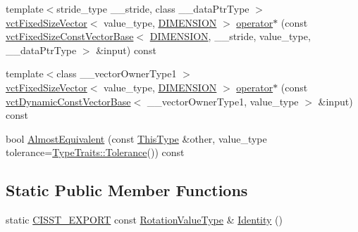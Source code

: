 \begin{DoxyCompactItemize}
\item 
{\footnotesize template$<$stride\+\_\+type \+\_\+\+\_\+stride, class \+\_\+\+\_\+data\+Ptr\+Type $>$ }\\\hyperlink{classvct_fixed_size_vector}{vct\+Fixed\+Size\+Vector}$<$ value\+\_\+type, \hyperlink{classvct_matrix_rotation3_const_base_a6bc9712dde55ee3fca0d7880feb6a903afdf02f4ad230d81f0ca2539c7feb61f3}{D\+I\+M\+E\+N\+S\+I\+O\+N} $>$ \hyperlink{classvct_matrix_rotation3_const_base_a185793b48e2be35f46bd0855cbec8b03}{operator$\ast$} (const \hyperlink{classvct_fixed_size_const_vector_base}{vct\+Fixed\+Size\+Const\+Vector\+Base}$<$ \hyperlink{classvct_matrix_rotation3_const_base_a6bc9712dde55ee3fca0d7880feb6a903afdf02f4ad230d81f0ca2539c7feb61f3}{D\+I\+M\+E\+N\+S\+I\+O\+N}, \+\_\+\+\_\+stride, value\+\_\+type, \+\_\+\+\_\+data\+Ptr\+Type $>$ \&input) const 
\item 
{\footnotesize template$<$class \+\_\+\+\_\+vector\+Owner\+Type1 $>$ }\\\hyperlink{classvct_fixed_size_vector}{vct\+Fixed\+Size\+Vector}$<$ value\+\_\+type, \hyperlink{classvct_matrix_rotation3_const_base_a6bc9712dde55ee3fca0d7880feb6a903afdf02f4ad230d81f0ca2539c7feb61f3}{D\+I\+M\+E\+N\+S\+I\+O\+N} $>$ \hyperlink{classvct_matrix_rotation3_const_base_a8ee7706c66f346505d81e3cdd0f8eaca}{operator$\ast$} (const \hyperlink{classvct_dynamic_const_vector_base}{vct\+Dynamic\+Const\+Vector\+Base}$<$ \+\_\+\+\_\+vector\+Owner\+Type1, value\+\_\+type $>$ \&input) const 
\item 
bool \hyperlink{classvct_matrix_rotation3_const_base_ad321ab64b8b9b8aa51230fedb0ab2ea3}{Almost\+Equivalent} (const \hyperlink{classvct_matrix_rotation3_const_base_ad26bf016ce37ea0532e1ce0aa7bba8a0}{This\+Type} \&other, value\+\_\+type tolerance=\hyperlink{classcmn_type_traits_adc129bf9867295b90d300768b780fa99}{Type\+Traits\+::\+Tolerance}()) const 
\end{DoxyCompactItemize}
\subsection*{Static Public Member Functions}
\begin{DoxyCompactItemize}
\item 
static \hyperlink{cmn_export_macros_8h_a99393e0c3ac434b2605235bbe20684f8}{C\+I\+S\+S\+T\+\_\+\+E\+X\+P\+O\+R\+T} const \hyperlink{classvct_matrix_rotation3_const_base_a913ecee79856db867ac6d45d27cfe362}{Rotation\+Value\+Type} \& \hyperlink{classvct_matrix_rotation3_const_base_addc1008b40782a836ca101f16b6f9de8}{Identity} ()
\end{DoxyCompactItemize}
